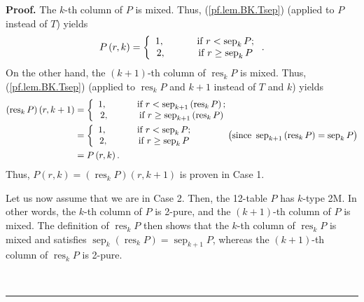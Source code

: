 \documentclass[numbers=enddot,12pt,final,onecolumn,notitlepage]{scrartcl}%
\theoremstyle{definition}
\newenvironment{proof}[1][Proof]{\noindent\textbf{#1.} }{\ \rule{0.5em}{0.5em}}
\begin{document}
\begin{proof}
The $k$-th column of $P$ is mixed. Thus, (\ref{pf.lem.BK.Tsep}) (applied to
$P$ instead of $T$) yields%
\[
P\left(  r,k\right)  =\left\{
\begin{array}
[c]{c}%
1,\ \ \ \ \ \ \ \ \ \ \text{if }r<\operatorname*{sep}\nolimits_{k}P;\\
2,\ \ \ \ \ \ \ \ \ \ \text{if }r\geq\operatorname*{sep}\nolimits_{k}P
\end{array}
\right.  .
\]
On the other hand, the $\left(  k+1\right)  $-th column of
$\operatorname*{res}\nolimits_{k}P$ is mixed. Thus, (\ref{pf.lem.BK.Tsep})
(applied to $\operatorname*{res}\nolimits_{k}P$ and $k+1$ instead of $T$ and
$k$) yields%
\begin{align*}
\left(  \operatorname*{res}\nolimits_{k}P\right)  \left(  r,k+1\right)   &
=\left\{
\begin{array}
[c]{c}%
1,\ \ \ \ \ \ \ \ \ \ \text{if }r<\operatorname*{sep}\nolimits_{k+1}\left(
\operatorname*{res}\nolimits_{k}P\right)  ;\\
2,\ \ \ \ \ \ \ \ \ \ \text{if }r\geq\operatorname*{sep}\nolimits_{k+1}\left(
\operatorname*{res}\nolimits_{k}P\right)
\end{array}
\right. \\
&  =\left\{
\begin{array}
[c]{c}%
1,\ \ \ \ \ \ \ \ \ \ \text{if }r<\operatorname*{sep}\nolimits_{k}P;\\
2,\ \ \ \ \ \ \ \ \ \ \text{if }r\geq\operatorname*{sep}\nolimits_{k}P
\end{array}
\right.  \ \ \ \ \ \ \ \ \ \ \left(  \text{since }\operatorname*{sep}%
\nolimits_{k+1}\left(  \operatorname*{res}\nolimits_{k}P\right)
=\operatorname*{sep}\nolimits_{k}P\right) \\
&  =P\left(  r,k\right)  .
\end{align*}
Thus, $P\left(  r,k\right)  =\left(  \operatorname*{res}\nolimits_{k}P\right)
\left(  r,k+1\right)  $ is proven in Case 1.

Let us now assume that we are in Case 2. Then, the 12-table $P$ has $k$-type
2M. In other words, the $k$-th column of $P$ is 2-pure, and the $\left(
k+1\right)  $-th column of $P$ is mixed. The definition of
$\operatorname*{res}\nolimits_{k}P$ then shows that the $k$-th column of
$\operatorname*{res}_{k}P$ is mixed and satisfies $\operatorname*{sep}%
\nolimits_{k}\left(  \operatorname*{res}\nolimits_{k}P\right)
=\operatorname*{sep}\nolimits_{k+1}P$, whereas the $\left(  k+1\right)  $-th
column of $\operatorname*{res}\nolimits_{k}P$ is 2-pure.


\end{proof}
\end{document}
